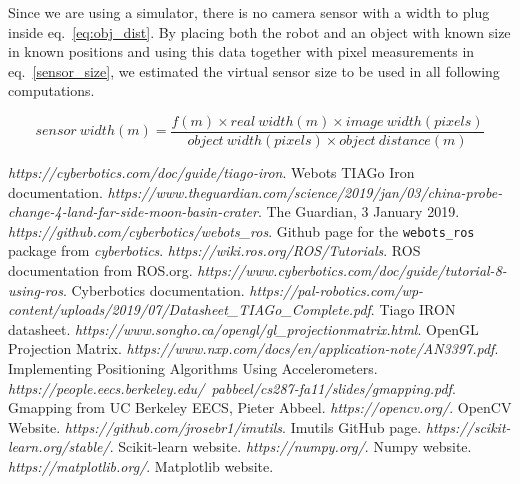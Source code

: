 \documentclass[a4paper]{article}
\begin{document}
	Since we are using a simulator, there is no camera sensor with a width to
	plug inside eq.~\ref{eq:obj_dist}. By placing both the robot and an object
	with known size in known positions and using this data together with pixel
	measurements in eq.~\ref{sensor_size}, we estimated the virtual sensor size
	to be used in all following computations.

	\begin{equation}\label{sensor_size}
		sensor~width(m) = 
		\frac{f(m) \times real~width(m) \times image~width(pixels)}
			{object~width(pixels) \times object~distance(m)}
	\end{equation}

	\newpage
	
	\begin{thebibliography}{19}
		\textit{https://cyberbotics.com/doc/guide/tiago-iron}. \newline
		Webots TIAGo Iron documentation.
		\textit{https://www.theguardian.com/science/2019/jan/03/china-probe-change-4-land-far-side-moon-basin-crater}. \newline
		The Guardian, 3 January 2019.
		\textit{https://github.com/cyberbotics/webots\_ros}. \newline
		Github page for the \texttt{webots\_ros} package from \textit{cyberbotics}.
		\textit{https://wiki.ros.org/ROS/Tutorials}. \newline
		ROS documentation from ROS.org.
		\textit{https://www.cyberbotics.com/doc/guide/tutorial-8-using-ros}. \newline
		Cyberbotics documentation.
		\textit{https://pal-robotics.com/wp-content/uploads/2019/07/Datasheet\_TIAGo\_Complete.pdf}. \newline
		Tiago IRON datasheet.
		\textit{https://www.songho.ca/opengl/gl\_projectionmatrix.html}. \newline
		OpenGL Projection Matrix.
		\textit{https://www.nxp.com/docs/en/application-note/AN3397.pdf}. \newline
		Implementing Positioning Algorithms Using Accelerometers.
		\textit{https://people.eecs.berkeley.edu/~pabbeel/cs287-fa11/slides/gmapping.pdf}. \newline
		Gmapping from UC Berkeley EECS, Pieter Abbeel.
		\textit{https://opencv.org/}. \newline
		OpenCV Website.
		\textit{https://github.com/jrosebr1/imutils}. \newline
		Imutils GitHub page.
		\textit{https://scikit-learn.org/stable/}. \newline
		Scikit-learn website.
		\textit{https://numpy.org/}. \newline
		Numpy website.
		\textit{https://matplotlib.org/}. \newline
		Matplotlib website.
	\end{thebibliography}
\end{document}
